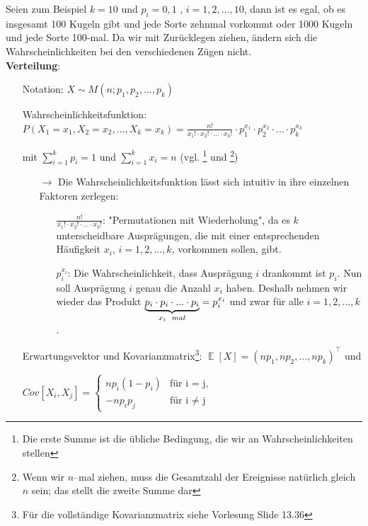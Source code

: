 \documentclass[a4paper]{article}
\DeclareMathOperator*{\E}{\mathbb{E}}
\begin{document}
\noindent Seien zum Beispiel $k=10$ und $p_i=0,1$ , $i=1,2,...,10$, dann ist es egal, ob es insgesamt 100 Kugeln gibt und jede Sorte zehnmal vorkommt oder 1000 Kugeln und jede Sorte 100-mal. Da wir mit Zurücklegen ziehen, ändern sich die Wahrscheinlichkeiten bei den verschiedenen Zügen nicht. \\

\noindent \textbf{Verteilung}:
\begin{itemize}
\item[] Notation: $X \sim M(n;p_1,p_2,...,p_k)$
\item[] Wahrscheinlichkeitsfunktion: $P(X_1=x_1,X_2=x_2,...,X_k=x_k)=\frac{n!}{x_1! \cdot x_2! \cdot ... \cdot x_k!} \cdot p_1^{x_1} \cdot p_2^{x_2} \cdot ... \cdot p_k^{x_k}$
\item[] \hspace{4.5cm} mit $\sum_{i=1}^kp_i=1$ und $\sum_{i=1}^kx_i=n$ (vgl. \footnote{Die erste Summe ist die übliche Bedingung, die wir an Wahrscheinlichkeiten stellen} und \footnote{Wenn wir $n$--mal ziehen, muss die Gesamtzahl der Ereignisse natürlich gleich $n$ sein; das stellt die zweite Summe dar})
	\begin{itemize}
	\item[$\rightarrow$] Die Wahrscheinlichkeitsfunktion lässt sich intuitiv in ihre einzelnen Faktoren zerlegen:
		\begin{itemize}
		\item[] $\frac{n!}{x_1! \cdot x_2! \cdot ... \cdot x_k!}$:  "Permutationen mit Wiederholung", da es $k$ unterscheidbare Ausprägungen, die mit einer entsprechenden Häufigkeit $x_i$, $i=1,2,...,k$, vorkommen sollen, gibt.  
		\item[] $p_i^{x_i}$: Die Wahrscheinlichkeit, dass Ausprägung $i$ drankommt ist $p_i$. Nun soll Ausprägung $i$ genau die Anzahl $x_i$ haben. Deshalb nehmen wir wieder das Produkt  $\underbrace{p_i\cdot p_i \cdot ... \cdot p_i}_{x_i \hspace{0.2cm} mal} = p_i^{x_i}$ und zwar für alle $i=1,2,...,k$.
		\end{itemize}
	\end{itemize}
\item[] Erwartungsvektor und Kovarianzmatrix\footnote{Für die vollständige Kovarianzmatrix siehe Vorlesung Slide 13.36}: $\E[X]=(np_1,np_2,...,np_k)^{\top}$ und
\item[] \hspace{6.5cm} $Cov[X_i,X_j]=\begin{cases}
			np_i(1-p_i) & \text{für i = j,}\\
            -np_ip_j & \text{für i $\neq$ j}
		 \end{cases}$ 

\end{itemize}
\end{document}

